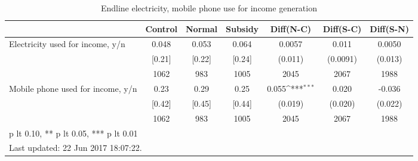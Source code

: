 \begin{table}[htbp]\centering
\def\sym#1{\ifmmode^{#1}\else\(^{#1}\)\fi}
\caption{Endline electricity, mobile phone use for income generation \label{tab:"balance"}}
\begin{tabular*}{1\hsize}{@{\hskip\tabcolsep\extracolsep\fill}l*{1}{cccccc}}
\toprule
                                &  Control&   Normal&  Subsidy&Diff(N-C)         &Diff(S-C)         &Diff(S-N)         \\
\midrule
Electricity used for income, y/n&    0.048&    0.053&    0.064&   0.0057         &    0.011         &   0.0050         \\
                                &   [0.21]&   [0.22]&   [0.24]&  (0.011)         & (0.0091)         &  (0.013)         \\
                                &     1062&      983&     1005&     2045         &     2067         &     1988         \\
Mobile phone used for income, y/n&     0.23&     0.29&     0.25&    0.055\sym{***}&    0.020         &   -0.036         \\
                                &   [0.42]&   [0.45]&   [0.44]&  (0.019)         &  (0.020)         &  (0.022)         \\
                                &     1062&      983&     1005&     2045         &     2067         &     1988         \\
\bottomrule
\multicolumn{7}{l}{\footnotesize * p lt 0.10, ** p lt 0.05, *** p lt 0.01}\\
\multicolumn{7}{l}{\footnotesize Last updated: 22 Jun 2017 18:07:22.}\\
\end{tabular*}
\end{table}
